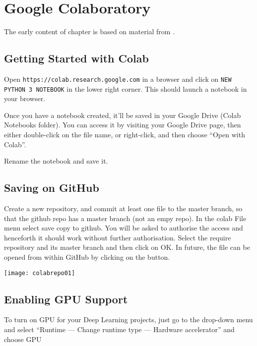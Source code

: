 
\chapter{Google Colaboratory}
\label{sec:Google Colaboratory}

The early content of chapter is based on material from  \cite{LiuCoLab2019}.

\section{Getting Started with Colab}

Open \lstinline{https://colab.research.google.com} in a browser and click on \lstinline{NEW PYTHON 3 NOTEBOOK} in the lower right corner.  This should launch a notebook in your browser. 

Once you have a notebook created, it'll be saved in your Google Drive (Colab Notebooks folder). You can access it by visiting your Google Drive page, then either double-click on the file name, or right-click, and then choose ``Open with Colab''. 

Rename the notebook and save it. 

\section{Saving on GitHub}

Create a new repository, and commit at least one file to the master branch, so that the github repo has a master branch (not an empy repo).
In the colab File menu select save copy to github.
You will be asked to authorise the access and henceforth it should work without further authorisation.
Select the require repository and its master branch and then click on OK.
In future, the file can be opened from within GitHub by clicking on the button.

\begin{figure*}[h]
\texttt{[image: colabrepo01]}
\end{figure*}


\section{Enabling GPU Support}

To turn on GPU for your Deep Learning projects, just go to the drop-down menu and select ``Runtime --- Change runtime type --- Hardware accelerator'' and choose GPU

